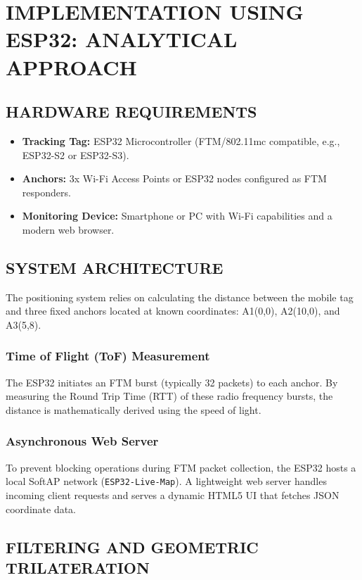 \documentclass[conference]{IEEEtran}
\begin{document}
\section{IMPLEMENTATION USING ESP32: ANALYTICAL APPROACH}

\subsection{HARDWARE REQUIREMENTS}
\begin{itemize}
    \item \textbf{Tracking Tag:} ESP32 Microcontroller (FTM/802.11mc compatible, e.g., ESP32-S2 or ESP32-S3).
    \item \textbf{Anchors:} 3x Wi-Fi Access Points or ESP32 nodes configured as FTM responders.
    \item \textbf{Monitoring Device:} Smartphone or PC with Wi-Fi capabilities and a modern web browser.
\end{itemize}

\subsection{SYSTEM ARCHITECTURE}
The positioning system relies on calculating the distance between the mobile tag and three fixed anchors located at known coordinates: A1(0,0), A2(10,0), and A3(5,8).

\subsubsection{Time of Flight (ToF) Measurement}
The ESP32 initiates an FTM burst (typically 32 packets) to each anchor. By measuring the Round Trip Time (RTT) of these radio frequency bursts, the distance is mathematically derived using the speed of light.

\subsubsection{Asynchronous Web Server}
To prevent blocking operations during FTM packet collection, the ESP32 hosts a local SoftAP network (\texttt{ESP32-Live-Map}). A lightweight web server handles incoming client requests and serves a dynamic HTML5 UI that fetches JSON coordinate data.

\subsection{FILTERING AND GEOMETRIC TRILATERATION}
\end{document}
